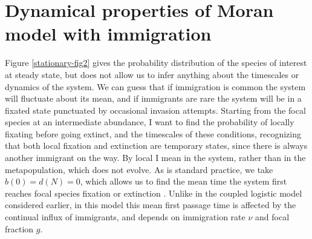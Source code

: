 \section{Dynamical properties of Moran model with immigration}
Figure \ref{stationary-fig2} gives the probability distribution of the species of interest at steady state, but does not allow us to infer anything about the timescales or dynamics of the system. 
We can guess that if immigration is common the system will fluctuate about its mean, and if immigrants are rare the system will be in a fixated state punctuated by occasional invasion attempts. 
Starting from the focal species at an intermediate abundance, I want to find the probability of locally fixating before going extinct, and the timescales of these conditions, recognizing that both local fixation and extinction are temporary states, since there is always another immigrant on the way. 
By local I mean in the system, rather than in the metapopulation, which does not evolve. 
As is standard practice, we take $b(0)=d(N)=0$, which allows us to find the mean time the system first reaches focal species fixation or extinction \cite{Nisbet1982}. %
Unlike in the coupled logistic model considered earlier, in this model this mean first passage time is affected by the continual influx of immigrants, and depends on immigration rate $\nu$ and focal fraction $g$. 

